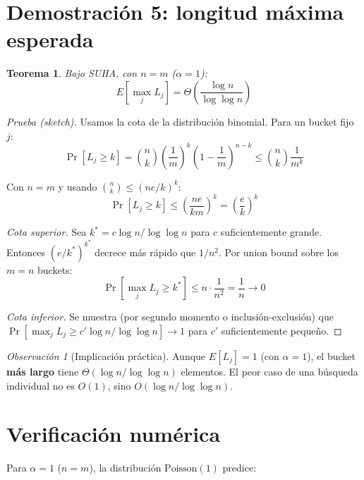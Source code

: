 \documentclass[11pt, letterpaper]{article}
\theoremstyle{definition}
\theoremstyle{plain}
\newtheorem{theorem}{Teorema}[section]
\theoremstyle{remark}
\newtheorem{remark}{Observación}[section]
\begin{document}
\section{Demostración 5: longitud máxima esperada}

\begin{theorem}\label{thm:max}
Bajo SUHA, con $n = m$ ($\alpha = 1$):
\[
  E\!\left[\max_j L_j\right]
  = \Theta\!\left(\frac{\log n}{\log \log n}\right)
\]
\end{theorem}

\begin{proof}[Prueba (sketch)]
Usamos la cota de la distribución binomial. Para un bucket fijo~$j$:
\[
  \Pr[L_j \geq k]
  = \binom{n}{k} \left(\frac{1}{m}\right)^{\!k}
    \left(1 - \frac{1}{m}\right)^{\!n-k}
  \leq \binom{n}{k} \frac{1}{m^k}
\]

Con $n = m$ y usando $\binom{n}{k} \leq (ne/k)^k$:
\[
  \Pr[L_j \geq k]
  \leq \left(\frac{ne}{km}\right)^{\!k}
  = \left(\frac{e}{k}\right)^{\!k}
\]

\emph{Cota superior.} Sea $k^* = c\log n / \log\log n$ para $c$
suficientemente grande. Entonces $(e/k^*)^{k^*}$ decrece más rápido
que $1/n^2$. Por union bound sobre los $m = n$ buckets:
\[
  \Pr\!\left[\max_j L_j \geq k^*\right]
  \leq n \cdot \frac{1}{n^2} = \frac{1}{n} \to 0
\]

\emph{Cota inferior.} Se muestra (por segundo momento o
inclusión-exclusión) que
$\Pr[\max_j L_j \geq c'\log n / \log\log n] \to 1$ para $c'$
suficientemente pequeño.
\end{proof}

\begin{remark}[Implicación práctica]
Aunque $E[L_j] = 1$ (con $\alpha = 1$), el bucket \textbf{más largo}
tiene $\Theta(\log n / \log\log n)$ elementos. El peor caso de una
búsqueda individual no es $O(1)$, sino
$O(\log n / \log\log n)$.
\end{remark}

\section{Verificación numérica}

Para $\alpha = 1$ ($n = m$), la distribución $\mathrm{Poisson}(1)$
predice:
\end{document}
